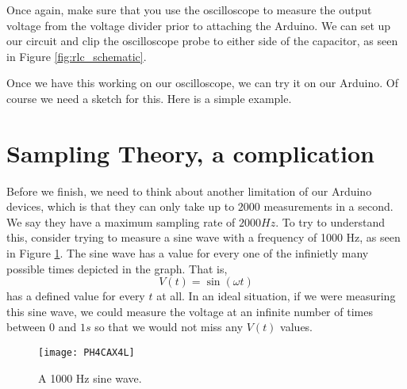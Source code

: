 Once again, make sure that you use the oscilloscope to measure the output
voltage from the voltage divider prior to attaching the Arduino.
We can set up our circuit and clip the oscilloscope probe to either side of
the capacitor, as seen in Figure \ref{fig:rlc_schematic}. 

Once we have this working on our oscilloscope, we can try it on our Arduino.
Of course we need a sketch for this. Here is a simple example.



\section{Sampling Theory, a complication}

Before we finish, we need to think about another
limitation of our Arduino devices, which is that they can only take up to $%
2000$ measurements in a second. We say they have a maximum sampling rate of $%
2000\unit{Hz}.$ To try to understand this, consider trying to measure a sine
wave with a frequency of 1000 Hz, as seen in Figure \ref{fig:sine}.
The sine wave has a value for every one of the infinietly many possible times
depicted in the graph. That is, 
\begin{equation*}
V\left( t\right) =\sin \left( \omega t\right)
\end{equation*}%
has a defined value for every $t$ at all. In an ideal situation, if we were 
measuring this sine wave, we could measure the voltage at an infinite 
number of times between 
$0$ and $1\unit{s}$ so that we would not miss any $V\left(
t\right) $ values. 
\begin{figure}[htbp!]
	\centering
\texttt{[image: PH4CAX4L]}
	\caption{A 1000 Hz sine wave.}
	\label{fig:sine}
\end{figure}


